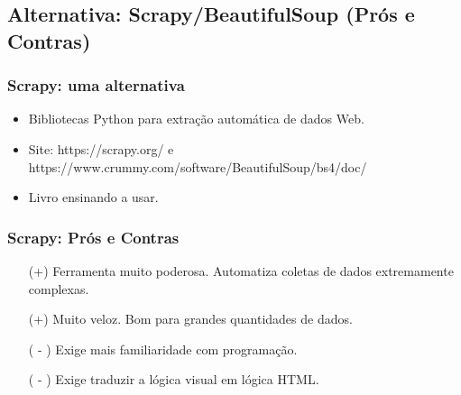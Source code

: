 \documentclass{beamer}
\begin{document}
\subsection{Alternativa: Scrapy/BeautifulSoup (Prós e Contras)} %
\begin{frame}
\frametitle{Scrapy: uma alternativa}
\begin{itemize}
\item Bibliotecas Python para extração automática de dados Web.\\
\item Site: https://scrapy.org/ e  https://www.crummy.com/software/BeautifulSoup/bs4/doc/\\
\item Livro ensinando a usar.\\
\end{itemize}
\end{frame}
\begin{frame}
\frametitle{Scrapy: Prós e Contras}
\begin{itemize}
\item[(+)] Ferramenta muito poderosa. Automatiza coletas de dados extremamente complexas.\\
\item[(+)] Muito veloz. Bom para grandes quantidades de dados.\\
\item[( - )] Exige mais familiaridade com programação.\\
\item[( - )] Exige traduzir a lógica visual em lógica HTML.\\
\end{itemize}
\end{frame}

\end{document}
